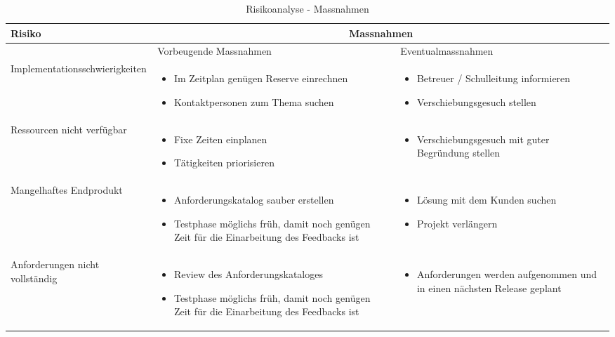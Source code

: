 \begin{table}[ht]
\centering
  \begin{tabular}{  l | p{4cm} | p{4cm} }
	\hline
	\rowcolor{darkgray}
	Risiko							&	\multicolumn{2}{|c|}{Massnahmen} \\ \hline
	\rowcolor{gray}
								&	Vorbeugende Massnahmen & Eventualmassnahmen	\\ \hline
	Implementationsschwierigkeiten
								&	\begin{itemize}
										\item Im Zeitplan genügen Reserve einrechnen
										\item Kontaktpersonen zum Thema suchen
									\end{itemize}
								&	\begin{itemize}
										\item Betreuer / Schulleitung informieren
										\item Verschiebungsgesuch stellen
									\end{itemize}						\\ \hline
	Ressourcen nicht verfügbar
								&	\begin{itemize}
										\item Fixe Zeiten einplanen
										\item Tätigkeiten priorisieren
									\end{itemize}
								&	\begin{itemize}
										\item Verschiebungsgesuch mit guter Begründung stellen
									\end{itemize}	\\ \hline
	Mangelhaftes Endprodukt		
								&	\begin{itemize}
										\item Anforderungskatalog sauber erstellen
										\item Testphase möglichs früh, damit noch genügen Zeit für die Einarbeitung des Feedbacks ist
									\end{itemize}
								&	\begin{itemize}
										\item Lösung mit dem Kunden suchen
										\item Projekt verlängern
									\end{itemize}	\\ \hline	
	Anforderungen nicht vollständig	
								&	\begin{itemize}
										\item Review des Anforderungskataloges
										\item Testphase möglichs früh, damit noch genügen Zeit für die Einarbeitung des Feedbacks ist
									\end{itemize}
								&	\begin{itemize}
										\item Anforderungen werden aufgenommen und in einen nächsten Release geplant											
									\end{itemize}	\\ \hline			
  \end{tabular}
   \caption{Risikoanalyse - Massnahmen}
\end{table}


